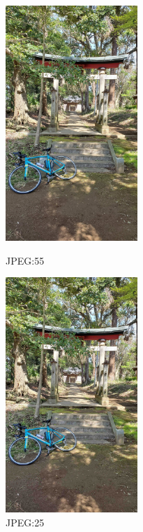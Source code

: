 \documentclass[a4paper,11pt]{bxjsarticle}
\begin{document}
   \begin{figure}[htbp]
    \begin{minipage}{0.5\hsize}
     \begin{center}
      \includegraphics[width=50mm]{sample_j55.jpg}
     \end{center}
     \caption{JPEG:55}
     \label{fig:j55}
    \end{minipage}
    \begin{minipage}{0.5\hsize}
     \begin{center}
      \includegraphics[width=50mm]{sample_j25.jpg}
     \end{center}
     \caption{JPEG:25}
     \label{fig:j25}
    \end{minipage}
   \end{figure}
\end{document}
